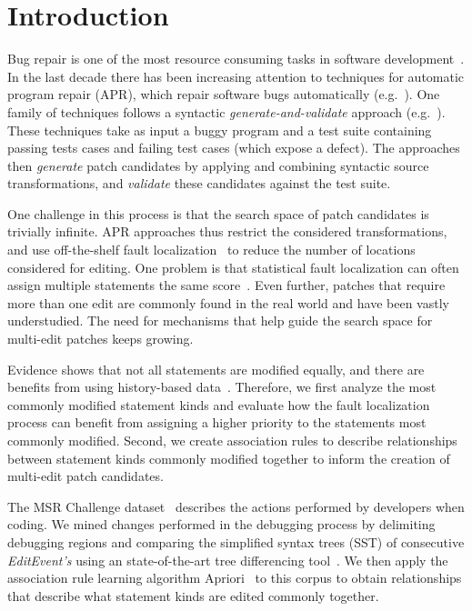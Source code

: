\documentclass[sigconf]{acmart}
\begin{document}

\maketitle

\section{Introduction}

Bug repair is one of the most resource consuming tasks in 
software development~\cite{Weiss07,Tassey02,Britton13}.
In the last decade there has been increasing attention to 
techniques for automatic program repair (APR), which 
repair software bugs
automatically (e.g.~\cite{legoues12,kim2013,Weimer13,long16proph}).
One family of techniques follows a syntactic \emph{generate-and-validate}
approach (e.g.~\cite{legoues12,kim2013,Qi13TrpAutoR,xuan16}). These techniques
take as input a buggy program and a test suite containing
passing tests cases and failing test cases (which expose a defect).
The approaches then \emph{generate} 
patch candidates by applying and combining syntactic source transformations, and 
\emph{validate} these 
candidates against the test suite.

One challenge in this process is that the search space
of patch candidates is trivially infinite.  APR approaches thus restrict the
considered transformations, and use off-the-shelf fault
localization~\cite{legoues12} to reduce the number of locations considered for
editing. One problem is that 
statistical fault localization can often assign multiple statements
the same score~\cite{Jones02}. Even further, patches that require
more than one edit are commonly found in the real world and have
been vastly understudied. The need for mechanisms that help guide
the search space for multi-edit patches keeps growing.

Evidence shows that not all statements are modified
equally, and there are benefits from using history-based
data~\cite{kim2013,Soto18}. 
Therefore, we first analyze the most commonly 
modified statement kinds and evaluate how the 
fault localization process can benefit from assigning
a higher priority to the statements most commonly modified.
Second, we create association rules to describe relationships
between statement kinds commonly modified together to inform
the creation of multi-edit patch candidates. 

The MSR Challenge dataset~\cite{msr18challenge}
describes the actions performed
by developers when coding.
We mined changes performed in the debugging
process by delimiting debugging regions
and comparing the simplified syntax
trees (SST) of consecutive \textit{EditEvent's} using an 
state-of-the-art tree differencing tool~\cite{Pawlik16Apted}.
We then apply the association
rule learning algorithm Apriori~\cite{Agrawal94} to this corpus
to obtain relationships that describe what statement kinds
are edited commonly together.
\end{document}
